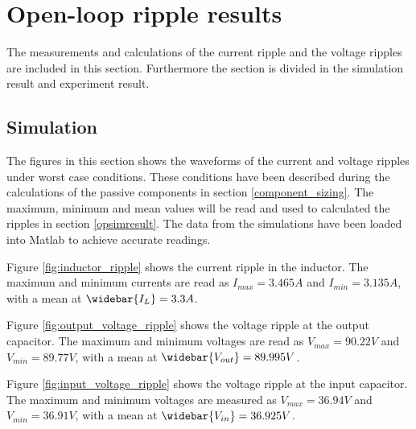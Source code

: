 
\chapter{Open-loop ripple results}
\vspace{-1cm}
The measurements and calculations of the current ripple and the voltage ripples are included in this section. Furthermore the section is divided in the simulation result and experiment result.
 \label{app:OL_ripple}
 
\section{Simulation}
The figures in this section shows the waveforms of the current and voltage ripples under worst case conditions. These conditions have been described during the calculations of the passive components in section \ref{component_sizing}. The maximum, minimum and mean values will be read and used to calculated the ripples in section \ref{opsimresult}. The data from the simulations have been loaded into Matlab to achieve accurate readings.

Figure \ref{fig:inductor_ripple} shows the current ripple in the inductor. The maximum and minimum currents are read as $I_{max} = 3.465A$ and $I_{min} = 3.135A$, with a mean at $\widebar{I_L} = 3.3A$.

Figure \ref{fig:output_voltage_ripple} shows the voltage ripple at the output capacitor. The maximum and minimum voltages are read as $V_{max} = 90.22V$ and $V_{min} = 89.77V$, with a mean at $\widebar{V_{out}} = 89.995V$.

Figure \ref{fig:input_voltage_ripple} shows the voltage ripple at the input capacitor. The maximum and minimum voltages are measured as $V_{max} = 36.94V$ and $V_{min} = 36.91V$, with a mean at $\widebar{V_{in}} = 36.925V$.


